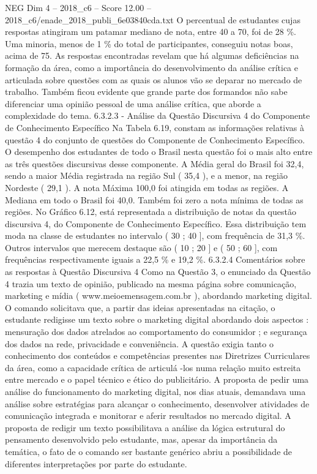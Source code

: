 \begin{textsample}{NEG Dim 4 – 2018\_c6 – Score 12.00 – 2018\_c6/enade\_2018\_publi\_6e03840cda.txt}
O percentual de estudantes cujas respostas atingiram um patamar mediano de nota, entre 40 a 70, foi de 28 \%.
Uma minoria, menos de 1 \% do total de participantes, conseguiu notas boas, acima de 75.
As respostas encontradas revelam que há algumas deficiências na formação da área, como a importância do desenvolvimento da análise crítica e articulada sobre questões com as quais os alunos vão se deparar no mercado de trabalho.
Também ficou evidente que grande parte dos formandos não sabe diferenciar uma opinião pessoal de uma análise crítica, que aborde a complexidade do tema. 6.3.2.3 - Análise da Questão Discursiva 4 do Componente de Conhecimento Específico Na Tabela 6.19, constam as informações relativas à questão 4 do conjunto de questões do Componente de Conhecimento Específico.
O desempenho dos estudantes de todo o Brasil nesta questão foi o mais alto entre as três questões discursivas desse componente.
A Média geral do Brasil foi 32,4, sendo a maior Média registrada na região Sul ( 35,4 ), e a menor, na região Nordeste ( 29,1 ).
A nota Máxima 100,0 foi atingida em todas as regiões.
A Mediana em todo o Brasil foi 40,0.
Também foi zero a nota mínima de todas as regiões.
No Gráfico 6.12, está representada a distribuição de notas da questão discursiva 4, do Componente de Conhecimento Específico.
Essa distribuição tem moda na classe de estudantes no intervalo ( 30 ; 40 ], com frequência de 31,3 \%.
Outros intervalos que merecem destaque são ( 10 ; 20 ] e ( 50 ; 60 ], com frequências respectivamente iguais a 22,5 \% e 19,2 \%. 6.3.2.4 Comentários sobre as respostas à Questão Discursiva 4 Como na Questão 3, o enunciado da Questão 4 trazia um texto de opinião, publicado na mesma página sobre comunicação, marketing e mídia ( www.meioemensagem.com.br ), abordando marketing digital.
O comando solicitava que, a partir das ideias apresentadas na citação, o estudante redigisse um texto sobre o marketing digital abordando dois aspectos : mensuração dos dados atrelados ao comportamento do consumidor ; e segurança dos dados na rede, privacidade e conveniência.
A questão exigia tanto o conhecimento dos conteúdos e competências presentes nas Diretrizes Curriculares da área, como a capacidade crítica de articulá -los numa relação muito estreita entre mercado e o papel técnico e ético do publicitário.
A proposta de pedir uma análise do funcionamento do marketing digital, nos dias atuais, demandava uma análise sobre estratégias para alcançar o conhecimento, desenvolver atividades de comunicação integrada e monitorar e aferir resultados no mercado digital.
A proposta de redigir um texto possibilitava a análise da lógica estrutural do pensamento desenvolvido pelo estudante, mas, apesar da importância da temática, o fato de o comando ser bastante genérico abriu a possibilidade de diferentes interpretações por parte do estudante.

\end{textsample}
